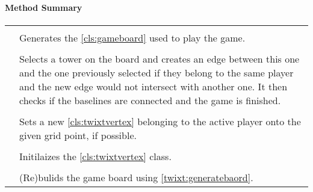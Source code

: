 \centerdash

\paragraph*{Method Summary}
\paragraph*{}
\begin{longtable}{Lp{10cm}}
	\startmethodtable
	 \\
	& Generates the \ref{cls:gameboard} used to play the game. \\
	 \\
	& Selects a tower on the board and creates an edge between this one and the one previously selected if they belong to the same player and the new edge would not intersect with another one.
	It then checks if the baselines are connected and the game is finished.\\
	 \\
	& Sets a new \ref{cls:twixtvertex} belonging to the active player onto the given grid point, if possible. \\
	 \\
	& Initilaizes the \ref{cls:twixtvertex} class. \\
	 \\
	& (Re)bulids the game board using \ref{twixt:generatebaord}. \\	
	\hline
\end{longtable}